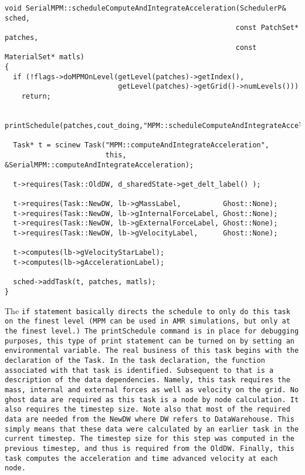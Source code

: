\begin{Verbatim}[fontsize=\footnotesize]
void SerialMPM::scheduleComputeAndIntegrateAcceleration(SchedulerP& sched,
                                                       const PatchSet* patches,
                                                       const MaterialSet* matls)
{
  if (!flags->doMPMOnLevel(getLevel(patches)->getIndex(),
                           getLevel(patches)->getGrid()->numLevels()))
    return;

  printSchedule(patches,cout_doing,"MPM::scheduleComputeAndIntegrateAcceleration\t\t\t\t");

  Task* t = scinew Task("MPM::computeAndIntegrateAcceleration",
                        this, &SerialMPM::computeAndIntegrateAcceleration);

  t->requires(Task::OldDW, d_sharedState->get_delt_label() );

  t->requires(Task::NewDW, lb->gMassLabel,          Ghost::None);
  t->requires(Task::NewDW, lb->gInternalForceLabel, Ghost::None);
  t->requires(Task::NewDW, lb->gExternalForceLabel, Ghost::None);
  t->requires(Task::NewDW, lb->gVelocityLabel,      Ghost::None);

  t->computes(lb->gVelocityStarLabel);
  t->computes(lb->gAccelerationLabel);

  sched->addTask(t, patches, matls);
}
\end{Verbatim}

The \tt if \normalfont statement basically directs the schedule to only do this task on the 
finest level (MPM can be used in AMR simulations, but only at the finest
level.)  The \tt printSchedule \normalfont command is in place for debugging purposes,
this type of print statement can be turned on by setting an environmental
variable.  The real business of this task begins with the declaration of the
Task.  In the task declaration, the function associated with that task is
identified.  Subsequent to that is a description of the data dependencies.
Namely, this task \tt requires \normalfont the mass, internal and external forces as well
as velocity on the grid.  No ghost data are required as this task is a 
node by node calculation.  It also requires the timestep size.  Note also
that most of the required data are needed from the \tt NewDW \normalfont where
\tt DW \normalfont refers to
DataWarehouse.  This simply means that these data were calculated by an
earlier task in the current timestep.  The timestep size for this step
was computed in the previous timestep, and thus is required from the \tt OldDW. \normalfont
Finally, this task \tt computes \normalfont the acceleration and time advanced velocity
at each node.

